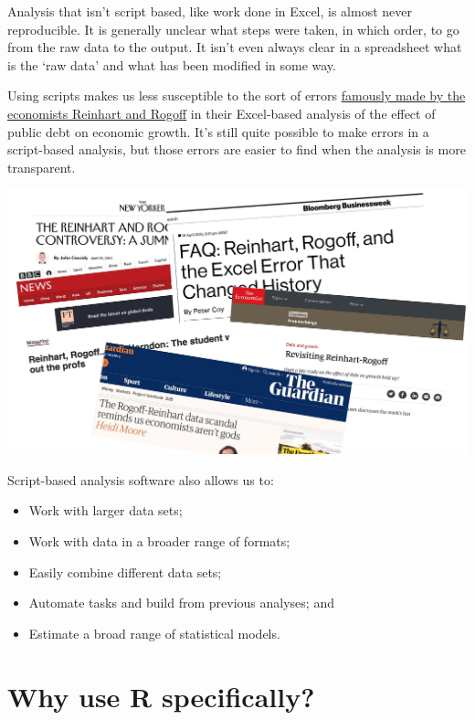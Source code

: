 \documentclass[]{book}
\providecommand{\tightlist}{%
  \setlength{\itemsep}{0pt}\setlength{\parskip}{0pt}}
\begin{document}
Analysis that isn't script based, like work done in Excel, is almost never reproducible. It is generally unclear what steps were taken, in which order, to go from the raw data to the output. It isn't even always clear in a spreadsheet what is the `raw data' and what has been modified in some way.

Using scripts makes us less susceptible to the sort of errors \href{https://en.wikipedia.org/wiki/Growth_in_a_Time_of_Debt\#Methodological_flaws}{famously made by the economists Reinhart and Rogoff} in their Excel-based analysis of the effect of public debt on economic growth. It's still quite possible to make errors in a script-based analysis, but those errors are easier to find when the analysis is more transparent.

\includegraphics[width=31.92in]{atlas/reinhart_rogoff}

Script-based analysis software also allows us to:

\begin{itemize}
\tightlist
\item
  Work with larger data sets;
\item
  Work with data in a broader range of formats;
\item
  Easily combine different data sets;
\item
  Automate tasks and build from previous analyses; and
\item
  Estimate a broad range of statistical models.
\end{itemize}

\hypertarget{why-R}{%
\section{Why use R specifically?}\label{why-R}}
\end{document}
